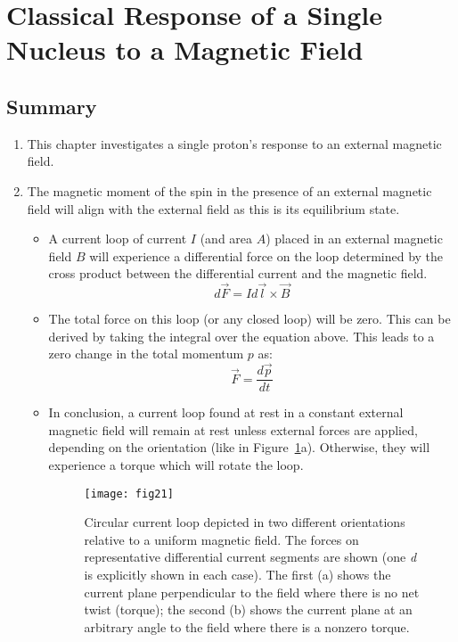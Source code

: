 \section{Classical Response of a Single Nucleus to a Magnetic Field}

\subsection{Summary} 
\begin{enumerate}
    \item This chapter investigates a single proton's response to an external magnetic field.
    \item The magnetic moment of the spin in the presence of an external magnetic field will align with the external field as this is its equilibrium state.

    \begin{itemize}
        \item A current loop of current $I$ (and area $A$) placed in an external magnetic field $B$ will experience a differential force on the loop determined by the cross product between the differential current and the magnetic field. \\
        \begin{equation}
            d\vec{F} = I d\vec{l} \times \vec{B}
        \end{equation}

        \item The total force on this loop (or any closed loop) will be zero. This can be derived by taking the integral over the equation above. This leads to a zero change in the total momentum $p$ as: \\
        \begin{equation}
            \vec{F} = \frac{d\vec{p}}{dt}
        \end{equation}

        \item In conclusion, a current loop found at rest in a constant external magnetic field 
        will remain at rest unless external forces are applied, 
        depending on the orientation (like in Figure~\ref{fig:fig21}a). 
        Otherwise, they will experience a torque which will rotate the loop.
        \begin{figure}[H]
            \centering
            \texttt{[image: fig21]}
            \caption{
           Circular current loop depicted in two different orientations relative to a uniform magnetic
        field. The forces on representative differential current segments are shown (one \textit{d} is explicitly shown
        in each case). The first (a) shows the current plane perpendicular to the field where there is no
        net twist (torque); the second (b) shows the current plane at an arbitrary angle to the field where
        there is a nonzero torque. 
            }
            \label{fig:fig21}
        \end{figure}


\end{itemize}
\end{enumerate}
